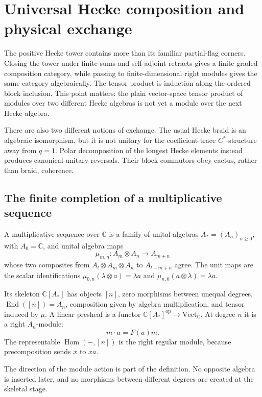 \clearpage
\section{Universal Hecke composition and physical exchange}
\label{sec:f1-limit-composition}

The positive Hecke tower contains more than its familiar partial-flag
corners.  Closing the tower under finite sums and self-adjoint retracts gives
a finite graded composition category, while passing to finite-dimensional
right modules gives the same category algebraically.  The tensor product is
induction along the ordered block inclusion.  This point matters: the plain
vector-space tensor product of modules over two different Hecke algebras is
not yet a module over the next Hecke algebra.

There are also two different notions of exchange.  The usual Hecke braid is
an algebraic isomorphism, but it is not unitary for the coefficient-trace
$C^*$-structure away from $q=1$.  Polar decomposition of the longest Hecke
elements instead produces canonical unitary reversals.  Their block
commutors obey cactus, rather than braid, coherence.

\subsection{The finite completion of a multiplicative sequence}

\begin{definition}
A multiplicative sequence over $\mathbb C$ is a family of unital algebras
$A_*=(A_n)_{n\geq0}$, with $A_0=\mathbb C$, and unital algebra maps
\[
 \mu_{m,n}:A_m\otimes A_n\longrightarrow A_{m+n}
\]
whose two composites from $A_l\otimes A_m\otimes A_n$ to $A_{l+m+n}$
agree.  The unit maps are the scalar identifications
$\mu_{0,n}(\lambda\otimes a)=\lambda a$ and
$\mu_{n,0}(a\otimes\lambda)=\lambda a$.

Its skeleton $\mathbb C[A_*]$ has objects $[n]$, zero morphisms between
unequal degrees, $\operatorname{End}([n])=A_n$, composition given by
algebra multiplication, and tensor induced by $\mu$.  A linear presheaf is
a functor $\mathbb C[A_*]^{\mathrm{op}}\to\mathrm{Vect}_{\mathbb C}$.
At degree $n$ it is a right $A_n$-module:
\[
 m\cdot a=F(a)m.
\]
The representable $\operatorname{Hom}(-,[n])$ is the right regular module,
because precomposition sends $x$ to $xa$.
\end{definition}
\begin{scope}
The direction of the module action is part of the definition.  No opposite
algebra is inserted later, and no morphisms between different degrees are
created at the skeletal stage.
\end{scope}

